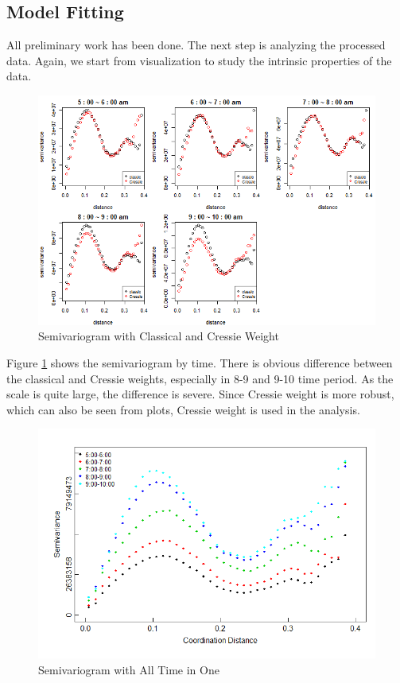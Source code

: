 \documentclass[hidelinks,12pt]{article}
\begin{document}
	\subsection{Model Fitting} \label{sec:resfit}
	All preliminary work has been done. The next step is analyzing the processed data. Again, we start from visualization to study the intrinsic properties of the data.
	\begin{figure}[!ht]
		\includegraphics[width=\textwidth]{semi.png}
		\caption{Semivariogram with Classical and Cressie Weight \label{fig:semi}}
	\end{figure}
\FloatBarrier
	Figure \ref{fig:semi} shows the semivariogram by time. There is obvious difference between the classical and Cressie weights, especially in 8-9 and 9-10 time period. As the scale is quite large, the difference is severe. Since Cressie weight is more robust, which can also be seen from plots, Cressie weight is used in the analysis.
	\begin{figure}[!ht]
		\includegraphics[width=\textwidth]{semi_full.png}
		\caption{Semivariogram with All Time in One \label{fig:semi_one}}
	\end{figure}
\end{document}
